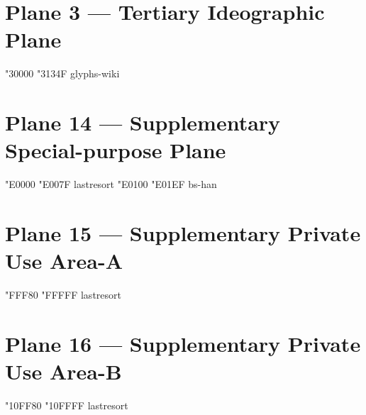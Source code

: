 \documentclass{article}
\begin{document}
\section{Plane 3 --- Tertiary Ideographic Plane}

             { "30000} { "3134F} {glyphs-wiki}

\section{Plane 14 --- Supplementary Special-purpose Plane}

                                           { "E0000} { "E007F} {lastresort}
                 { "E0100} { "E01EF} {bs-han}

\section{Plane 15 --- Supplementary Private Use Area-A}

               { "FFF80} { "FFFFF} {lastresort}

\section{Plane 16 --- Supplementary Private Use Area-B}

               {"10FF80} {"10FFFF} {lastresort}
\end{document}
